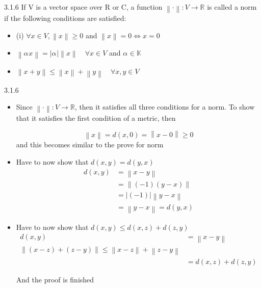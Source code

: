\documentclass[a4paper,norsk]{article}
\renewcommand{\geq}{\geqslant}
\renewcommand{\leq}{\leqslant}
\begin{document}
\begin{oppgavebox}{3.1.6}{}
If V is a vector space over R or C, a function $ \left\lVert \cdot \right\rVert : V \rightarrow \mathbb{R} $  is called a norm if the following conditions are satisfied:
\begin{itemize}
  \item (i) $ \forall x \in V, \left\lVert x \right\rVert \geq 0$ and $ \left\lVert x \right\rVert = 0 \iff x=0 $ 
  \item $ \left\lVert \alpha_{}^{} x \right\rVert  = \left| \alpha_{}^{}  \right| \left\lVert x \right\rVert \quad \forall x \in V $ and $ \alpha_{}^{} \in \mathbb{K} $ 
  \item $ \left\lVert x + y \right\rVert \leq \left\lVert x \right\rVert + \left\lVert y \right\rVert \quad \forall x, y \in V $  
\end{itemize}


\begin{proofbox}{3.1.6}{}
  \begin{itemize}
    \item Since $ \left\lVert \cdot \right\rVert : V \rightarrow \mathbb{R}  $, then it satisfies all three conditions for a norm. To show that it satisfies the first condition of a metric, then

  \[
    \left\lVert x \right\rVert = d(x, 0) = \left\lVert x - 0 \right\rVert \geq 0
  \]
  and this becomes similar to the prove for norm

  \item Have to now show that $ d(x, y) = d(y, x) $ 
  \begin{align*}
    d(x, y) &= \left\lVert x - y \right\rVert \\
    &= \left\lVert \left( -1 \right) \left( y - x \right)  \right\rVert \\
    &= \left| \left( -1 \right) \right| \left\lVert y - x \right\rVert \\
    &= \left\lVert y - x \right\rVert = d(y, x)
  \end{align*}

  \item Have to now show that $ d(x, y) \leq d(x, z) + d(z, y) $ 
  \begin{align*}
    d(x, y) &= \left\lVert x - y \right\rVert \\
    \left\lVert \left( x - z \right) + \left( z-y \right)  \right\rVert \leq \left\lVert x-z \right\rVert + \left\lVert z-y \right\rVert \\
    &= d(x, z) + d(z, y)
  \end{align*}
  
  And the proof is finished
  \end{itemize} 
  
\end{proofbox}
\end{oppgavebox}
\end{document}
